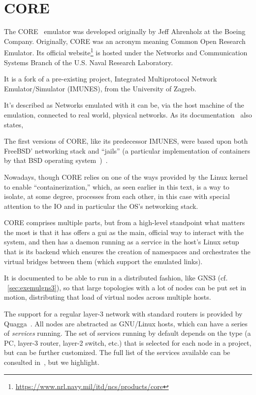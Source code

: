 \section{CORE}
\label{sec:exemulcore}

The CORE~\cite{coreemulator} emulator was developed originally by Jeff Ahrenholz at the Boeing Company.
Originally, CORE was an acronym meaning Common Open Research Emulator.
Its official website\footnote{\url{https://www.nrl.navy.mil/itd/ncs/products/core}} is hosted under the Networks and Communication Systems Branch of the U.S. Naval Research Laboratory.

It is a fork of a pre-existing project, Integrated Multiprotocol Network Emulator/Simulator (IMUNES), from the University of Zagreb.

It's described as 
Networks emulated with it can be, via the host machine of the emulation, connected to real world, physical networks.
As its documentation~
\cite{coreghdocs} also states, 

The first versions of CORE, like its predecessor IMUNES, were based upon both FreeBSD' networking stack and ``jails'' (a particular implementation of containers by that BSD operating system~\cite{freebsdjails})~\cite{comparisonofcore}.

Nowadays, though CORE relies on one of the ways provided by the Linux kernel to enable ``containerization,'' which, as seen earlier in this text, is a way to isolate, at some degree, processes from each other, in this case with special attention to the IO and in particular the OS's networking stack. %

CORE comprises multiple parts, but from a high-level standpoint what matters the most is that it has offers a \gls{gui} as the main, official way to interact with the system, and then has a daemon running as a service in the host's Linux setup that is its backend which ensures the creation of namespaces and orchestrates the virtual bridges between them (which support the emulated links).

It is documented to be able to run in a distributed fashion, like GNS3 (cf. ~\ref{sec:exemulgns3}), so that large topologies with a lot of nodes can be put set in motion, distributing that load of virtual nodes across multiple hosts.

The support for a regular layer-3 network with standard routers is provided by Quagga~\cite{quagga}.
All nodes are abstracted as GNU/Linux hosts, which can have a series of \emph{services} running.
The set of services running by default depends on the type (a PC, layer-3 router, layer-2 switch, etc.) that is selected for each node in a project, but can be further customized.
The full list of the services available can be consulted in~\cite{coreemuservices}, but we highlight. %

